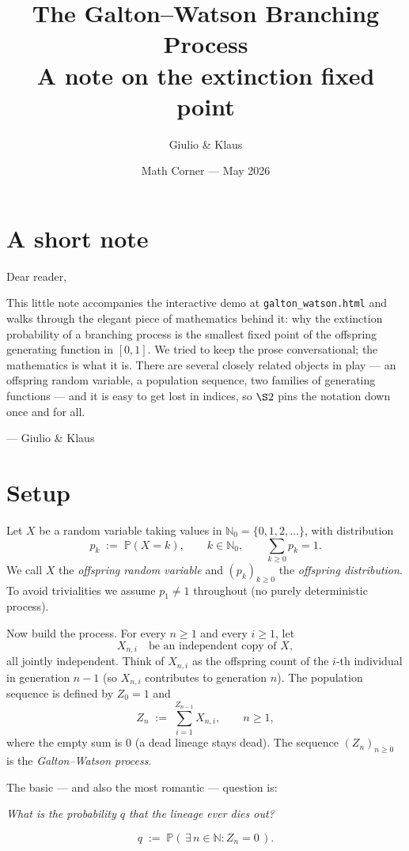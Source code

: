\documentclass[11pt]{article}
\title{The Galton--Watson Branching Process\\[2pt]
  \large A note on the extinction fixed point}
\author{Giulio \& Klaus}
\date{Math Corner --- May 2026}
\begin{document}
\maketitle

\section*{A short note}
\noindent Dear reader,

\smallskip
\noindent This little note accompanies the interactive demo at
\texttt{galton\_watson.html} and walks through the elegant piece of
mathematics behind it: why the extinction probability of a branching
process is the smallest fixed point of the offspring generating
function in $[0,1]$. We tried to keep the prose conversational; the
mathematics is what it is. There are several closely related objects
in play --- an offspring random variable, a population sequence, two
families of generating functions --- and it is easy to get lost in
indices, so $\S 2$ pins the notation down once and for all.

\smallskip
\hfill --- Giulio \& Klaus

\section{Setup}
Let $X$ be a random variable taking values in $\mathbb{N}_0 = \{0, 1, 2, \dots\}$, with distribution
\[
p_k \;:=\; \mathbb{P}(X = k), \qquad k \in \mathbb{N}_0, \qquad \sum_{k \geq 0} p_k = 1.
\]
We call $X$ the \emph{offspring random variable} and $(p_k)_{k \geq 0}$ the \emph{offspring distribution}. To avoid trivialities we assume $p_1 \neq 1$ throughout (no purely deterministic process).

Now build the process. For every $n \geq 1$ and every $i \geq 1$, let
\[
X_{n,i} \quad\text{be an independent copy of } X,
\]
all jointly independent. Think of $X_{n,i}$ as the offspring count of the $i$-th individual in generation $n-1$ (so $X_{n,i}$ contributes to generation $n$). The population sequence is defined by $Z_0 = 1$ and
\[
Z_n \;:=\; \sum_{i = 1}^{Z_{n-1}} X_{n, i}, \qquad n \geq 1,
\]
where the empty sum is $0$ (a dead lineage stays dead). The sequence $(Z_n)_{n \geq 0}$ is the \emph{Galton--Watson process}.

The basic --- and also the most romantic --- question is:
\begin{center}
  \emph{What is the probability $q$ that the lineage ever dies out?}
\end{center}
\[
q \;:=\; \mathbb{P}\!\left(\,\exists\, n \in \mathbb{N} : Z_n = 0\,\right).
\]
\end{document}

